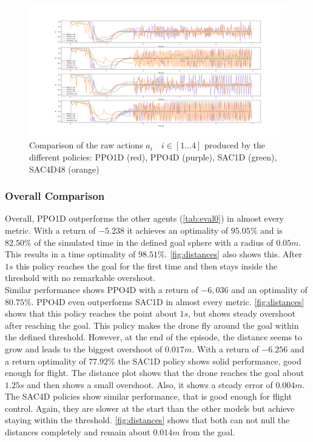 \begin{figure}
	\centering
	\includegraphics[width=1\linewidth]{figures/actionlog.png}
	\caption{Comparison of the raw actions $a_i \quad i \in [1...4]$ produced
	by the different policies:
	PPO1D (red), PPO4D (purple), SAC1D (green), SAC4D48 (orange)}
	\label{fig:actcompare}
\end{figure}

\subsubsection{Overall Comparison}
Overall, PPO1D outperforms the other agents (\cref{tab:eval0}) in almost
every metric. With a return of $-5.238$ it achieves an optimality of 
$95.05 \%$ and is $82.50 \%$ of the simulated time in the 
defined goal sphere with a radius of $0.05m$. This results in a time optimality
of $98.51 \%$.
\cref{fig:distances} also shows this. After $1s$ this policy reaches the goal
for the first time and then stays inside the threshold with no 
remarkable overshoot.\\
Similar performance shows PPO4D with a return of $-6,036$ and an optimality of
$80.75 \%$. PPO4D even outperforms SAC1D in almost every
metric. \cref{fig:distances} shows that this policy reaches the point about $1s$,
but shows steady overshoot after reaching the goal.
This policy makes the drone fly around the goal within the defined threshold.
However, at the end of the episode, the distance seems to grow and leads to 
the biggest overshoot of $0.017m$.
With a return of $-6.256$ and a return optimality of $77.92 \%$ the SAC1D
policy shows solid performance, good enough for flight.
The distance plot shows that the drone reaches the goal about $1.25s$ and then
shows a small overshoot. Also, it shows a steady error of $0.004m$.
The SAC4D policies show similar performance, that is good enough for flight control.
Again, they are slower at the start than the other models but achieve staying
within the threshold. \cref{fig:distances} shows that both can not null the 
distances completely and remain about $0.014m$ from the goal.

